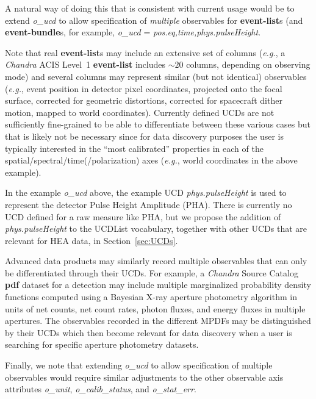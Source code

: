 \documentclass[11pt,a4paper]{ivoa}
\begin{document}
A natural way of doing this that is consistent with current usage would be to extend {\em o\_ucd\/} to allow specification of {\em multiple\/} observables for {\bf event-list}s (and {\bf event-bundle}s, for example, {\em o\_ucd\/} = {\em pos.eq,time,phys.pulseHeight\/}.

Note that real {\bf event-list}s may include an extensive set of columns ({\em e.g.\/}, a {\em Chandra\/} ACIS Level~1 {\bf event-list} includes $\sim\!20$ columns, depending on observing mode) and several columns may represent similar (but not identical) observables ({\em e.g.\/}, event position in detector pixel coordinates, projected onto the focal surface, corrected for geometric distortions, corrected for spacecraft dither motion, mapped to world coordinates).  Currently defined UCDs are not sufficiently fine-grained to be able to differentiate between these various cases but that is likely not be necessary since for data discovery purposes the user is typically interested in the ``most calibrated'' properties in each of the spatial/spectral/time(/polarization) axes ({\em e.g.\/}, world coordinates in the above example).

In the example {\em o\_ucd\/} above, the example UCD {\em phys.pulseHeight\/} is used to represent the detector Pulse Height Amplitude (PHA).  There is currently no UCD defined for a raw measure like PHA, but we propose the addition of {\em phys.pulseHeight\/} to the UCDList vocabulary, together with other UCDs that are relevant for HEA data, in Section~\ref{sec:UCDs}.

Advanced data products may similarly record multiple observables that can only be differentiated through their UCDs.  For example, a {\em Chandra\/} Source Catalog {\bf pdf} dataset for a detection may include multiple marginalized probability density functions computed using a Bayesian X-ray aperture photometry algorithm in units of net counts, net count rates, photon fluxes, and energy fluxes in multiple apertures.  The observables recorded in the different MPDFs may be distinguished by their UCDs which then become relevant for data discovery when a user is searching for specific aperture photometry datasets.

Finally, we note that extending {\em o\_ucd\/} to allow specification of multiple observables would require similar adjustments to the other observable axis attributes {\em o\_unit}, {\em o\_calib\_status}, and {\em o\_stat\_err}.
\end{document}
